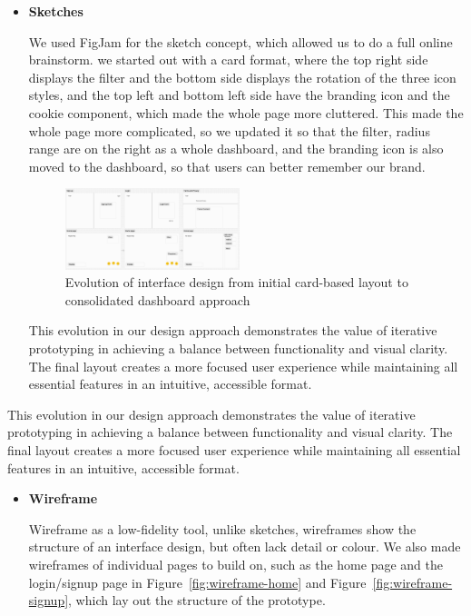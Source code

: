 \begin{itemize}
\item \textbf{Sketches}

We used FigJam for the sketch concept, which allowed us to do a full online brainstorm. we started out with a card format, where the top right side displays the filter and the bottom side displays the rotation of the three icon styles, and the top left and bottom left side have the branding icon and the cookie component, which made the whole page more cluttered. This made the whole page more complicated, so we updated it so that the filter, radius range are on the right as a whole dashboard, and the branding icon is also moved to the dashboard, so that users can better remember our brand.


\begin{figure}[h]
    \centering
    \includegraphics[width=0.48\textwidth]{images/sketch.jpg}
    \caption{Evolution of interface design from initial card-based layout to consolidated dashboard approach}
    \label{fig:prototype-evolution}
\end{figure}
This evolution in our design approach demonstrates the value of iterative prototyping in achieving a balance between functionality and visual clarity. The final layout creates a more focused user experience while maintaining all essential features in an intuitive, accessible format.

\end{itemize}
This evolution in our design approach demonstrates the value of iterative prototyping in achieving a balance between functionality and visual clarity. The final layout creates a more focused user experience while maintaining all essential features in an intuitive, accessible format.

\begin{itemize}
\item \textbf{Wireframe}

Wireframe as a low-fidelity tool, unlike sketches, wireframes show the structure of an interface design, but often lack detail or colour. We also made wireframes of individual pages to build on, such as the home page and the login/signup page in Figure~\ref{fig:wireframe-home} and Figure~\ref{fig:wireframe-signup}, which lay out the structure of the prototype.
\end{itemize}

